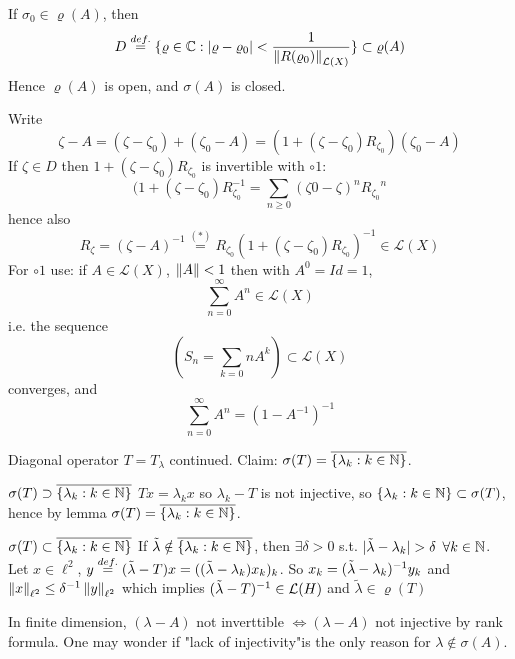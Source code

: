 \documentclass{article}
\begin{document}
\begin{lemma}\nl
If $\sigma_0\in\varrho(A)$, then 
$$D\stackrel{def.}{=}
\{
\varrho\in\mathbb{C}:|\varrho-\varrho_0|<\frac{1}{\left\|{R(\varrho_0)}\right\|_{\mathcal{L}(X)}}
\}
\subset\varrho(A)$$
Hence $\varrho(A)$ is open, and $\sigma(A)$ is closed.
\begin{pf}{}{}
Write 
$$
\zeta-A=
( \zeta-\zeta_0)+(\zeta_0-A)=(1+(\zeta-\zeta_0)R_{\zeta_0})(\zeta_0-A)
$$
If $\zeta\in D$ then $1+(\zeta-\zeta_0)R_{\zeta_0}$ is invertible with $\circ{1}$:
$$
(1+(\zeta-\zeta_0)R_{\zeta_0}^{-1}=\sum_{n\geq0}(\zeta0-\zeta)^n {R_{\zeta_0}}^n
$$
hence also
$$
R_\zeta=(\zeta-A)^{-1}\stackrel{(*)}{=}R_{\zeta_0}(1+(\zeta-\zeta_0)R_{\zeta_0})^{-1}\in\mathcal{L}(X)
$$
For $\circ{1}$ use: if $A\in\mathcal{L}(X)$, $\left\|{A}\right\|<1$ then with $A^0=Id=1$, 
$$
\sum_{n=0}^\infty A^n\in\mathcal{L}(X)
$$
i.e. the sequence
$$
\left(
S_n=\sum_{k=0}n A^k
\right)\subset\mathcal{L}(X)
$$
converges, and
$$
\sum_{n=0}^\infty A^n=(1-A^{-1})^{-1}
$$
\end{pf}
\end{lemma}

\begin{example}\nl
    Diagonal operator $T=T_\lambda$ continued. Claim: $\sigma(T)=\overline{\{\lambda_k:k\in\mathbb{N}\}}$.
    \begin{pf}{$\sigma(T)\supset\overline{\{\lambda_k:k\in\mathbb{N}\}}$}{}
    $Tx=\lambda_k x$ so $\lambda_k-T$ is not injective, so $\{\lambda_k:k\in\mathbb{N}\}\subset\sigma(T)$, hence by lemma $\sigma(T)=\overline{\{\lambda_k:k\in\mathbb{N}\}}$.
    \end{pf}

    \begin{pf}{$\sigma(T)\subset\overline{\{\lambda_k:k\in\mathbb{N}\}}$}{}
    If $\Tilde{\lambda}\notin\overline{\{\lambda_k:k\in\mathbb{N}\}}$, then $\exists\delta>0$ s.t. $|\Tilde{\lambda}-\lambda_k|>\delta$ $\forall k\in\mathbb{N}$. Let $x\in\ell^2$, $y\stackrel{def.}{=}(\Tilde{\lambda}-T)x=((\Tilde{\lambda}-\lambda_k)x_k)_k$. So $x_k=(\Tilde{\lambda}-\lambda_k)^{-1}y_k$ and $\left\|{x}\right\|_{\ell^2}\leq\delta^{-1}\left\|{y}\right\|_{\ell^2}$ which implies $(\Tilde{\lambda}-T)^{-1}\in\mathcal{L}(H)$ and $\tilde{\lambda}\in\varrho(T)$
    \end{pf}
\end{example}

\begin{remark}\nl
    In finite dimension, $(\lambda-A)$ not inverttible $\iff(\lambda-A)$ not injective by rank formula. One may wonder if "lack of injectivity"is the only reason for $\lambda\notin \sigma(A)$.
\end{remark}
\end{document}
